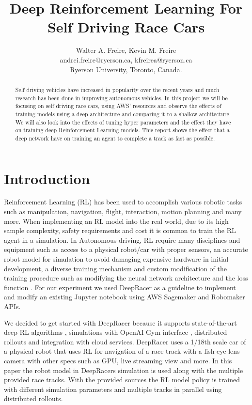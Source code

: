 \documentclass[journal]{IEEEtran}
\begin{document}
\title{Deep Reinforcement Learning For Self Driving Race Cars}
\author{Walter A. Freire, Kevin M. Freire\\
andrei.freire@ryerson.ca, kfreirea@ryerson.ca\\
Ryerson University, Toronto, Canada.}
\maketitle

\begin{abstract}
Self driving vehicles have increased in popularity over the recent years and much research has been done in improving autonomous vehicles.  In this project we will be focusing on self driving race cars, using AWS' resources and observe the effects of training models using a deep architecture and comparing it to a shallow architecture.  We will also look into the effects of tuning hyper parameters and the effect they have on training deep Reinforcement Learning models.  This report shows the effect that a deep network have on training an agent to complete a track as fast as possible.
\end{abstract}

\section{Introduction}
Reinforcement Learning (RL) has been used to accomplish various robotic tasks such as manipulation, navigation, flight, interaction, motion planning and many more. When implementing an RL model into the real world, due to its high sample complexity, safety requirements and cost it is common to train the RL agent in a simulation. In Autonomous driving, RL require many disciplines and equipment such as access to a physical robot/car with proper sensors, an accurate robot model for simulation to avoid damaging expensive hardware in initial development, a diverse training mechanism and custom modification of the training procedure such as modifying the neural network architecture and the loss function \cite{9197465}. For our experiment we used DeepRacer as a guideline to implement and modify an existing Jupyter notebook using AWS Sagemaker and Robomaker APIs.

We decided to get started with DeepRacer because it supports state-of-the-art deep RL algorithms \cite{caspi10reinforcement}, simulations with OpenAI Gym interface \cite{brockman2016openai}, distributed rollouts and integration with cloud services. DeepRacer uses a 1/18th scale car of a physical robot that uses RL for navigation of a race track with a fish-eye lens camera \cite{9197465} with other specs such as GPU, live streaming view and more. In this paper the robot model in DeepRacers simulation is used along with the multiple provided race tracks. With the provided sources the RL model policy is trained with different simulation parameters and multiple tracks in parallel using distributed rollouts.
\end{document}
